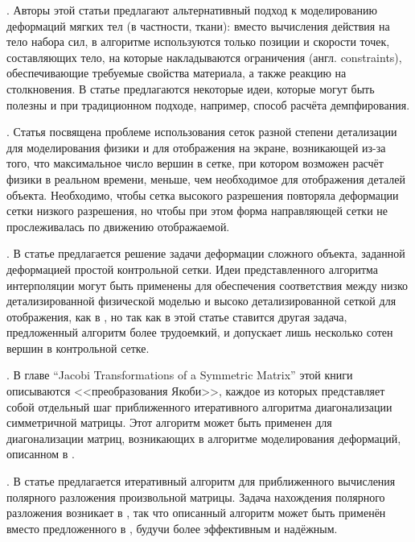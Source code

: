 \documentclass[a4paper,11pt]{report}
\begin{document}
    \cite[Position Based Dynamics]{muller-position-dynamics}. Авторы этой статьи предлагают
      альтернативный подход к моделированию деформаций мягких тел (в частности, ткани): вместо
      вычисления действия на тело набора сил, в алгоритме используются только позиции и скорости
      точек, составляющих тело, на которые накладываются ограничения (англ. {\English constraints}),
      обеспечивающие требуемые свойства материала, а также реакцию на столкновения. В статье
      предлагаются некоторые идеи, которые могут быть полезны и при традиционном подходе, например,
      способ расчёта демпфирования.

    \cite[Deforming a High-Resolution Mesh...]{visser-mapping}. Статья посвящена проблеме
      использования сеток разной степени детализации для моделирования физики и для отображения на
      экране, возникающей из-за того, что максимальное число вершин в сетке, при котором возможен
      расчёт физики в реальном времени, меньше, чем необходимое для отображения деталей объекта.
      Необходимо, чтобы сетка высокого разрешения повторяла деформации сетки низкого разрешения, но
      чтобы при этом форма направляющей сетки не прослеживалась по движению отображаемой.

    \cite[Efficient Mesh Deformation Using Tetrahedron Control Mesh]{huang-control-mesh}.
      В статье предлагается решение задачи деформации сложного объекта, заданной деформацией простой
      контрольной сетки. Идеи представленного алгоритма интерполяции могут быть применены для
      обеспечения соответствия между низко детализированной физической моделью и высоко детализированной
      сеткой для отображения, как в \cite{visser-mapping}, но так как в этой статье ставится другая
      задача, предложенный алгоритм более трудоемкий, и допускает лишь несколько сотен вершин в
      контрольной сетке.

    \cite[Numerical Recipes...]{fortran-jacobi}. В главе {\English ``Jacobi Transformations of
      a Symmetric Matrix''} этой книги описываются <<преобразования Якоби>>, каждое из которых
      представляет собой отдельный шаг приближенного итеративного алгоритма диагонализации
      симметричной матрицы. Этот алгоритм может быть применен для диагонализации матриц, возникающих
      в алгоритме моделирования деформаций, описанном в \cite{muller-meshless}.
      
    \cite[Frobenius Iteration for the Matrix Polar Decomposition]{hp-polar}. В статье
      предлагается итеративный алгоритм для приближенного вычисления полярного разложения
      произвольной матрицы. Задача нахождения полярного разложения возникает в \cite{muller-meshless},
      так что описанный алгоритм может быть применён вместо предложенного в \cite{muller-meshless},
      будучи более эффективным и надёжным.
\end{document}
